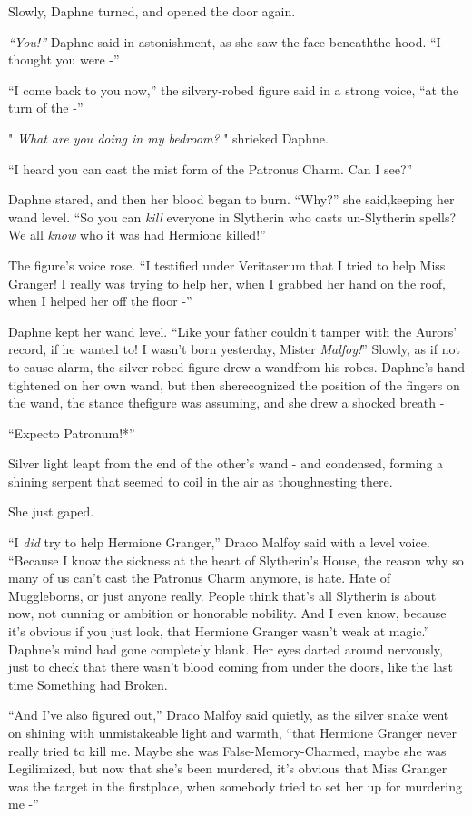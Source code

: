 Slowly, Daphne turned, and opened the door again.

\emph{``You!''} Daphne said in astonishment, as she saw the face beneaththe hood. ``I thought you were -''

``I come back to you now,'' the silvery-robed figure said in a strong voice, ``at the turn of the -''

" \emph{What are you doing in my bedroom?} " shrieked Daphne.

``I heard you can cast the mist form of the Patronus Charm. Can I see?''

Daphne stared, and then her blood began to burn. ``Why?'' she said,keeping her wand level. ``So you can \emph{kill} everyone in Slytherin who casts un-Slytherin spells? We all \emph{know} who it was had Hermione killed!''

The figure's voice rose. ``I testified under Veritaserum that I tried to help Miss Granger! I really was trying to help her, when I grabbed her hand on the roof, when I helped her off the floor -''

Daphne kept her wand level. ``Like your father couldn't tamper with the Aurors' record, if he wanted to! I wasn't born yesterday, Mister \emph{Malfoy!}''
Slowly, as if not to cause alarm, the silver-robed figure drew a wandfrom his robes. Daphne's hand tightened on her own wand, but then sherecognized the position of the fingers on the wand, the stance thefigure was assuming, and she drew a shocked breath -

``Expecto Patronum!*''

Silver light leapt from the end of the other's wand - and condensed, forming a shining serpent that seemed to coil in the air as thoughnesting there.

She just gaped.

``I \emph{did} try to help Hermione Granger,'' Draco Malfoy said with a level voice. ``Because I know the sickness at the heart of Slytherin's House, the reason why so many of us can't cast the Patronus Charm anymore, is hate. Hate of Muggleborns, or just anyone really. People think that's all Slytherin is about now, not cunning or ambition or honorable nobility. And I even know, because it's obvious if you just look, that Hermione Granger wasn't weak at magic.''
Daphne's mind had gone completely blank. Her eyes darted around nervously, just to check that there wasn't blood coming from under the doors, like the last time Something had Broken.

``And I've also figured out,'' Draco Malfoy said quietly, as the silver snake went on shining with unmistakeable light and warmth, ``that Hermione Granger never really tried to kill me. Maybe she was False-Memory-Charmed, maybe she was Legilimized, but now that she's been murdered, it's obvious that Miss Granger was the target in the firstplace, when somebody tried to set her up for murdering me -''

